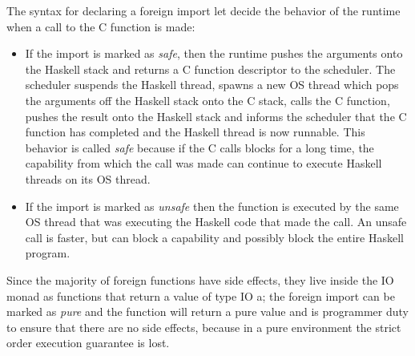 The syntax for declaring a foreign import let decide the behavior of the runtime when a call to the C function is made:
\begin{itemize}
\item If the import is marked as \emph{safe}, then the runtime pushes the arguments onto the Haskell stack and returns a C function descriptor to the scheduler.
The scheduler suspends the Haskell thread, spawns a new OS thread which pops the arguments off the Haskell stack onto the C stack, calls the C function, pushes the result onto the Haskell stack and informs the scheduler that the C function has completed and the Haskell thread is now runnable.
This behavior is called \emph{safe} because if the C calls blocks for a long time, the capability from which the call was made can continue to execute Haskell threads on its OS thread.
\item If the import is marked as \emph{unsafe} then the function is executed by the same OS thread that was executing the Haskell code that made the call. An unsafe call is faster, but can block a capability and possibly block the entire Haskell program.
\end{itemize}

Since the majority of foreign functions have side effects, they live inside the IO monad as functions that return a value of type IO a; the foreign import can be marked as \emph{pure} and the function will return a pure value and is programmer duty to ensure that there are no side effects, because in a pure environment the strict order execution guarantee is lost.


